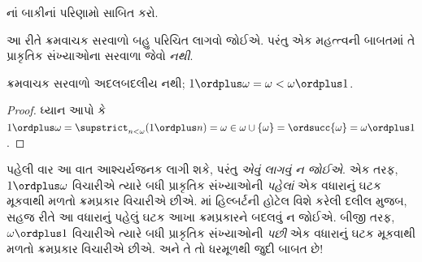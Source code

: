 \documentclass[../../../include/open-logic-section]{subfiles}
\begin{document}
\begin{prob}
નાં
બાકીનાં પરિણામો સાબિત કરો.
\end{prob}

આ રીતે ક્રમવાચક સરવાળો બહુ પરિચિત લાગવો જોઈએ.
પરંતુ એક મહત્ત્વની બાબતમાં તે પ્રાકૃતિક સંખ્યાઓના
સરવાળા જેવો \emph{નથી}.

\begin{prop}
ક્રમવાચક સરવાળો {અદલબદલીય નથી};
$1 \ordplus  \omega = \omega <
\omega \ordplus  1$.
\end{prop}

\begin{proof}
ધ્યાન આપો કે $1 \ordplus  \omega = \supstrict_{n < \omega} (1 \ordplus n)
= \omega \in \omega \cup \{\omega\} = \ordsucc{\omega} = \omega
\ordplus  1$.
\end{proof}
\noindent
પહેલી વાર આ વાત આશ્ચર્યજનક લાગી શકે, પરંતુ
\emph{એવું લાગવું ન જોઈએ}. એક તરફ,
$1 \ordplus  \omega$ વિચારીએ ત્યારે બધી પ્રાકૃતિક
સંખ્યાઓની \emph{પહેલાં} એક વધારાનું ઘટક મૂકવાથી
મળતો ક્રમપ્રકાર વિચારીએ છીએ.
માં હિલ્બર્ટની હોટેલ
વિશે કરેલી દલીલ મુજબ, સહજ રીતે આ વધારાનું પહેલું
ઘટક આખા ક્રમપ્રકારને બદલવું ન જોઈએ. બીજી તરફ,
$\omega \ordplus  1$ વિચારીએ ત્યારે બધી પ્રાકૃતિક
સંખ્યાઓની \emph{પછી} એક વધારાનું ઘટક મૂકવાથી
મળતો ક્રમપ્રકાર વિચારીએ છીએ. અને તે તો ધરમૂળથી
જુદી બાબત છે!
\end{document}
